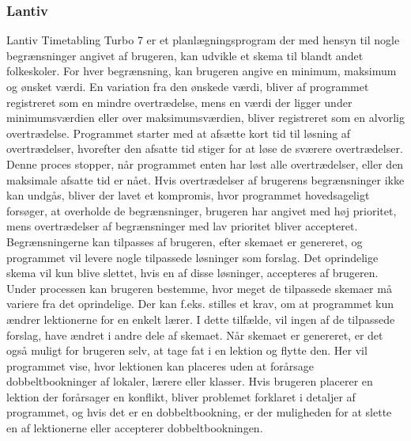 \subsubsection{Lantiv}
Lantiv Timetabling Turbo 7 er et planlægningsprogram der med hensyn til nogle begrænsninger angivet af brugeren, kan udvikle et skema til blandt andet folkeskoler. For hver begrænsning, kan brugeren angive en minimum, maksimum og ønsket værdi. En variation fra den ønskede værdi, bliver af programmet registreret som en mindre overtrædelse, mens en værdi der ligger under minimumsværdien eller over maksimumsværdien, bliver registreret som en alvorlig overtrædelse. Programmet starter med at afsætte kort tid til løsning af overtrædelser, hvorefter den afsatte tid stiger for at løse de sværere overtrædelser. Denne proces stopper, når programmet enten har løst alle overtrædelser, eller den maksimale afsatte tid er nået. Hvis overtrædelser af brugerens begrænsninger ikke kan undgås, bliver der lavet et kompromis, hvor programmet hovedsageligt forsøger, at overholde de begrænsninger, brugeren har angivet med høj prioritet, mens overtrædelser af begrænsninger med lav prioritet bliver accepteret. Begrænsningerne kan tilpasses af brugeren, efter skemaet er genereret, og programmet vil levere nogle tilpassede løsninger som forslag. Det oprindelige skema vil kun blive slettet, hvis en af disse løsninger, accepteres af brugeren. Under processen kan brugeren bestemme, hvor meget de tilpassede skemaer må variere fra det oprindelige. Der kan f.eks. stilles et krav, om at programmet kun ændrer lektionerne for en enkelt lærer. I dette tilfælde, vil ingen af de tilpassede forslag, have ændret i andre dele af skemaet. Når skemaet er genereret, er det også muligt for brugeren selv, at tage fat i en lektion og flytte den. Her vil programmet vise, hvor lektionen kan placeres uden at forårsage dobbeltbookninger af lokaler, lærere eller klasser. Hvis brugeren placerer en lektion der forårsager en konflikt, bliver problemet forklaret i detaljer af programmet, og hvis det er en dobbeltbookning, er der muligheden for at slette en af lektionerne eller accepterer dobbeltbookningen\cite{biblop1:17}.
